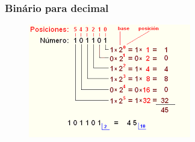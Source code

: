 \documentclass[10pt]{beamer}
\begin{document}
\begin{frame}[fragile]

\frametitle{Binário para decimal}

\begin{figure}[!ht]
\centering
\includegraphics[height =.65\textheight,width=.8\textwidth]
{figuras/binario_decimal.png}
\end{figure}

\end{frame}
\end{document}
